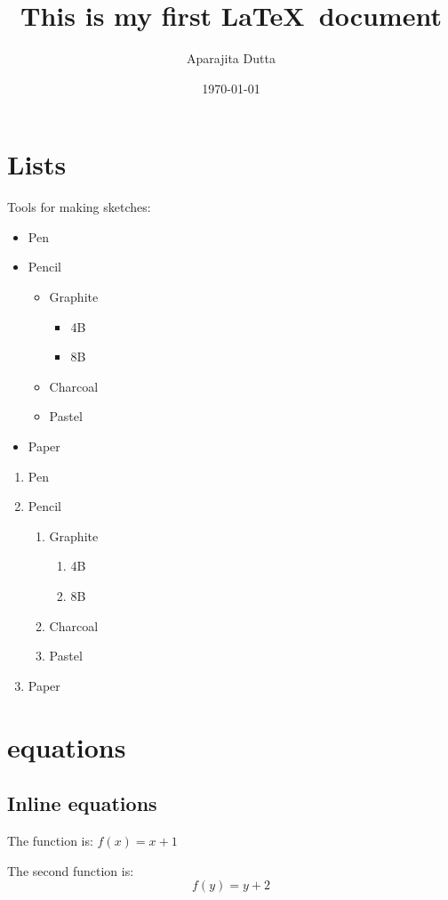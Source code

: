 \documentclass[12pt]{article}
\begin{document}
	\title{ This is my first \LaTeX \ document}
	\author{Aparajita Dutta}
	\date{\today}
\maketitle
\tableofcontents
\newpage
\section{Lists}
	Tools for making sketches:
	
\begin{itemize}
	\item Pen
	\item Pencil
	\begin{itemize}
		\item Graphite
		\begin{itemize}
			\item 4B
			\item 8B
		\end{itemize}
		\item Charcoal
		\item Pastel
	\end{itemize}
	\item Paper
\end{itemize}

\begin{enumerate}
	\item Pen
	\item Pencil
	\begin{enumerate}
		\item Graphite
		\begin{enumerate}
			\item 4B
			\item 8B
		\end{enumerate}
		\item Charcoal
		\item Pastel
	\end{enumerate}
	\item Paper
\end{enumerate}

\section{equations}
\subsection{Inline equations}
The function is: $f(x) = x+1$

The second function is: $$f(y) = y+2$$
\end{document}
